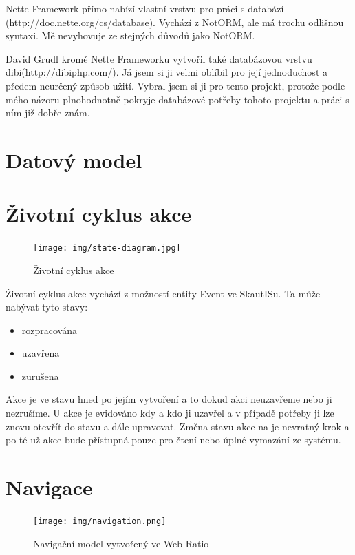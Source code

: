 \documentclass[thesis=B,czech]{FITthesis}[2011/06/14]
\begin{document}
Nette Framework přímo nabízí vlastní vrstvu pro práci s databází (http://doc.nette.org/cs/database). Vychází z NotORM, ale má trochu odlišnou syntaxi. Mě nevyhovuje ze stejných důvodů jako NotORM.

David Grudl kromě Nette Frameworku vytvořil také databázovou vrstvu dibi(http://dibiphp.com/). Já jsem si ji velmi oblíbil pro její jednoduchost a předem neurčený způsob užití. Vybral jsem si ji pro tento projekt, protože podle mého názoru plnohodnotně pokryje databázové potřeby tohoto projektu a práci s ním již dobře znám.

\section{Datový model}


\section{Životní cyklus akce}
 \begin{figure}[h] \centering
 	\texttt{[image: img/state-diagram.jpg]}
 	\caption[Životní cyklus akce]{Životní cyklus akce}\label{fig:state-diagram}
 \end{figure}
 Životní cyklus akce vychází z možností entity Event ve SkautISu. Ta může nabývat tyto stavy:
 
 \begin{itemize}
 	\item rozpracována
	\item uzavřena
	\item zurušena
 \end{itemize} 
 
 Akce je ve stavu  hned po jejím vytvoření a to dokud akci neuzavřeme nebo ji nezrušíme. U  akce je evidováno kdy a kdo ji uzavřel a v případě potřeby ji lze znovu otevřít do stavu  a dále upravovat. Změna stavu akce na  je nevratný krok a po té už akce bude přístupná pouze pro čtení nebo úplné vymazání ze systému.  

\section{Navigace}
 \begin{figure}[h] \centering
 	\texttt{[image: img/navigation.png]}
 	\caption[Navigační model]{Navigační model vytvořený ve Web Ratio}\label{fig:navigation-diagram}
 \end{figure}
\end{document}
